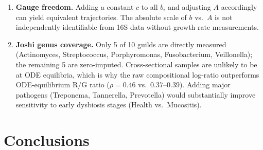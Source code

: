 \documentclass[11pt,a4paper]{article}
\begin{document}
\begin{enumerate}
  \item \textbf{Gauge freedom.} Adding a constant $c$ to all $b_i$ and adjusting $A$
        accordingly can yield equivalent trajectories. The absolute scale of $b$ vs.\ $A$
        is not independently identifiable from 16S data without growth-rate measurements.

  \item \textbf{Joshi genus coverage.} Only 5 of 10 guilds are directly measured
        (Actinomyces, Streptococcus, Porphyromonas, Fusobacterium, Veillonella); the
        remaining 5 are zero-imputed.  Cross-sectional samples are unlikely to be at
        ODE equilibria, which is why the raw compositional log-ratio outperforms
        ODE-equilibrium R/G ratio ($\rho=0.46$ vs.\ $0.37$--$0.39$).  Adding major
        pathogens (Treponema, Tannerella, Prevotella) would substantially improve
        sensitivity to early dysbiosis stages (Health vs.\ Mucositis).
\end{enumerate}

\section{Conclusions}
\label{sec:conclusions}
\end{document}
